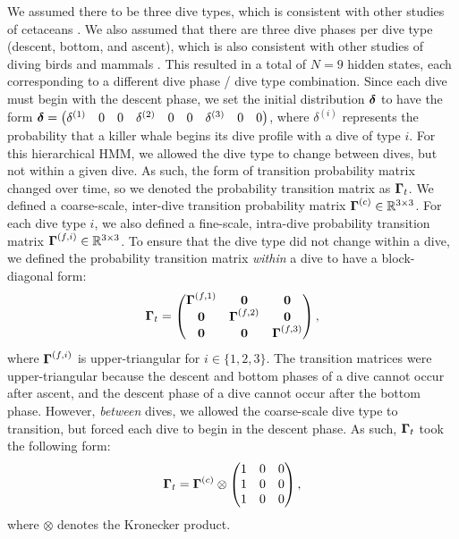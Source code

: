 We assumed there to be three dive types, which is consistent with other studies of cetaceans \citep[e.g. resting, foraging and traveling,][]{Barajas:2017}. We also assumed that there are three dive phases per dive type (descent, bottom, and ascent), which is also consistent with other studies of diving birds and mammals \citep[e.g.][]{Vivant:2014}. This resulted in a total of $N = 9$ hidden states, each corresponding to a different dive phase / dive type combination.
%
Since each dive must begin with the descent phase, we set the initial distribution $\boldsymbol{\delta}$ to have the form
%
    $\boldsymbol{\delta} = \begin{pmatrix} \delta^{(1)} & 0 & 0 & \delta^{(2)} & 0 & 0 & \delta^{(3)} & 0 & 0 \end{pmatrix}$,
%
where $\delta^{(i)}$ represents the probability that a killer whale begins its dive profile with a dive of type $i$. 
%
For this hierarchical HMM, we allowed the dive type to change between dives, but not within a given dive. As such, the form of transition probability matrix changed over time, so we denoted the probability transition matrix as $\boldsymbol{\Gamma}_t$. We defined a coarse-scale, inter-dive transition probability matrix $\boldsymbol{\Gamma}^{(c)} \in \mathbb{R}^{3 \times 3}$. For each dive type $i$, we also defined a fine-scale, intra-dive probability transition matrix $\boldsymbol{\Gamma}^{(f,i)} \in \mathbb{R}^{3 \times 3}$. 
%
To ensure that the dive type did not change within a dive, we defined the probability transition matrix \textit{within} a dive to have a block-diagonal form:
%
\begin{equation}
    \boldsymbol{\Gamma}_t = 
    \begin{pmatrix}
        \boldsymbol{\Gamma}^{(f,1)} & \mathbf{0} & \mathbf{0} \\
        \mathbf{0} & \boldsymbol{\Gamma}^{(f,2)} & \mathbf{0} \\
        \mathbf{0} & \mathbf{0} & \boldsymbol{\Gamma}^{(f,3)} \\
    \end{pmatrix},
\end{equation}
%
where $\boldsymbol{\Gamma}^{(f,i)}$ is upper-triangular for $i \in \{1,2,3\}$. The transition matrices were upper-triangular because the descent and bottom phases of a dive cannot occur after ascent, and the descent phase of a dive cannot occur after the bottom phase.
%
However, \textit{between} dives, we allowed the coarse-scale dive type to transition, but forced each dive to begin in the descent phase. As such, $\boldsymbol{\Gamma}_t$ took the following form:
%
\begin{equation}
    \boldsymbol{\Gamma}_t = \boldsymbol{\Gamma}^{(c)} \otimes \begin{pmatrix} 1 & 0 & 0 \\ 1 & 0 & 0 \\ 1 & 0 & 0 \end{pmatrix},
\end{equation}
%
where $\otimes$ denotes the Kronecker product.

